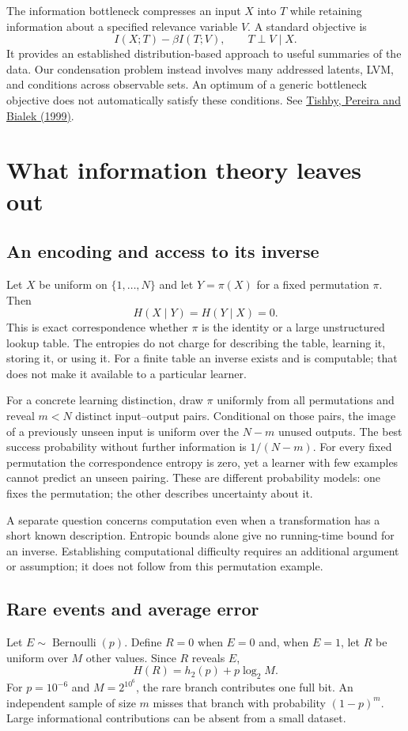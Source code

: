 \documentclass[10pt]{article}
\begin{document}
The information bottleneck compresses an input $X$ into $T$ while retaining
information about a specified relevance variable $V$. A standard objective is
\[
 I(X;T)-\beta I(T;V), \qquad T\perp V\mid X.
\]
It provides an established distribution-based approach to useful summaries of
the data.
Our condensation problem instead involves many addressed latents, LVM, and
conditions across observable sets. An optimum of a generic
bottleneck objective does not automatically satisfy these conditions.
See \href{https://arxiv.org/abs/physics/0004057}{Tishby, Pereira and Bialek (1999)}.

\section{What information theory leaves out}
\subsection{An encoding and access to its inverse}
Let $X$ be uniform on $\{1,\ldots,N\}$ and let $Y=\pi(X)$ for a fixed
permutation $\pi$. Then
\[
 H(X\mid Y)=H(Y\mid X)=0.
\]
This is exact correspondence whether $\pi$ is the identity or a large
unstructured lookup table. The entropies do not charge for describing the table,
learning it, storing it, or using it. For a finite table an inverse exists and is
computable; that does not make it available to a particular learner.

For a concrete learning distinction, draw $\pi$ uniformly from all permutations
and reveal $m<N$ distinct input--output pairs. Conditional on those pairs, the
image of a previously unseen input is uniform over the $N-m$ unused outputs. The best success
probability without further information is $1/(N-m)$. For every fixed permutation
the correspondence entropy is zero, yet a learner with few examples cannot
predict an unseen pairing. These are different probability models: one fixes
the permutation; the other describes uncertainty about it.

A separate question concerns computation even when a transformation has a short
known description. Entropic bounds alone give no running-time bound for an
inverse. Establishing computational difficulty requires an additional argument
or assumption; it does not follow from this permutation example.

\subsection{Rare events and average error}
Let $E\sim\operatorname{Bernoulli}(p)$. Define $R=0$ when $E=0$ and, when
$E=1$, let $R$ be uniform over $M$ other values. Since $R$ reveals $E$,
\[
 H(R)=h_2(p)+p\log_2 M.
\]
For $p=10^{-6}$ and $M=2^{10^6}$, the rare branch contributes one full bit.
An independent sample of size $m$ misses that branch with probability
$(1-p)^m$. Large informational contributions can be absent from a small
dataset.
\end{document}
